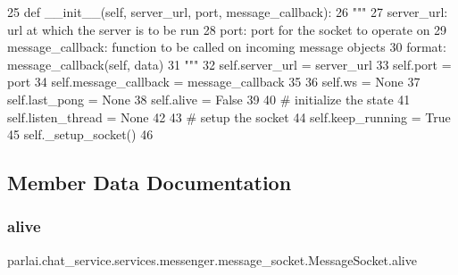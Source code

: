 \begin{DoxyCode}
25     \textcolor{keyword}{def }\_\_init\_\_(self, server\_url, port, message\_callback):
26         \textcolor{stringliteral}{"""}
27 \textcolor{stringliteral}{        server\_url:           url at which the server is to be run}
28 \textcolor{stringliteral}{        port:                 port for the socket to operate on}
29 \textcolor{stringliteral}{        message\_callback:     function to be called on incoming message objects}
30 \textcolor{stringliteral}{                              format: message\_callback(self, data)}
31 \textcolor{stringliteral}{        """}
32         self.server\_url = server\_url
33         self.port = port
34         self.message\_callback = message\_callback
35 
36         self.ws = \textcolor{keywordtype}{None}
37         self.last\_pong = \textcolor{keywordtype}{None}
38         self.alive = \textcolor{keyword}{False}
39 
40         \textcolor{comment}{# initialize the state}
41         self.listen\_thread = \textcolor{keywordtype}{None}
42 
43         \textcolor{comment}{# setup the socket}
44         self.keep\_running = \textcolor{keyword}{True}
45         self.\_setup\_socket()
46 
\end{DoxyCode}


\subsection{Member Data Documentation}
\mbox{\label{classparlai_1_1chat__service_1_1services_1_1messenger_1_1message__socket_1_1MessageSocket_ac6cb7e773c1c2cbe2cc1bc661bc20fc2}} 
\subsubsection{\texorpdfstring{alive}{alive}}
{\footnotesize\ttfamily parlai.\+chat\+\_\+service.\+services.\+messenger.\+message\+\_\+socket.\+Message\+Socket.\+alive}



